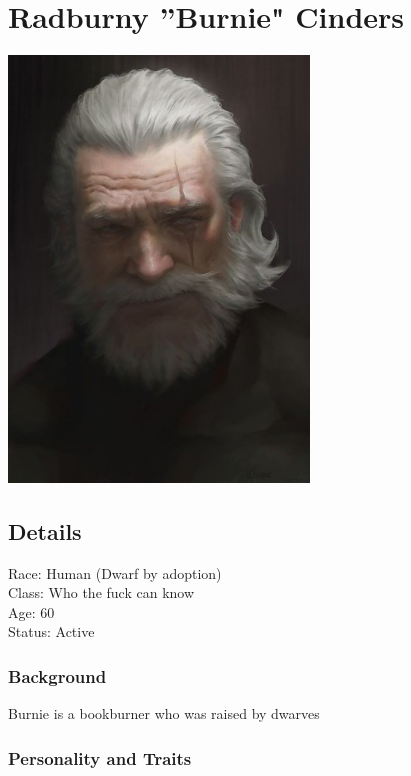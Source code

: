 \section{Radburny ''Burnie" Cinders}

\begin{center}
\includegraphics[width=80mm]{./content/img/burnie.png}
\begin{figure}[h]
\end{figure}
\end{center}

\subsection*{Details} 

\noindent

Race: 	Human (Dwarf by adoption) \\
Class: 	Who the fuck can know \\
Age: 	60 \\
Status: Active 

\subsubsection{Background}

Burnie is a bookburner who was raised by dwarves

\subsubsection{Personality and Traits}

